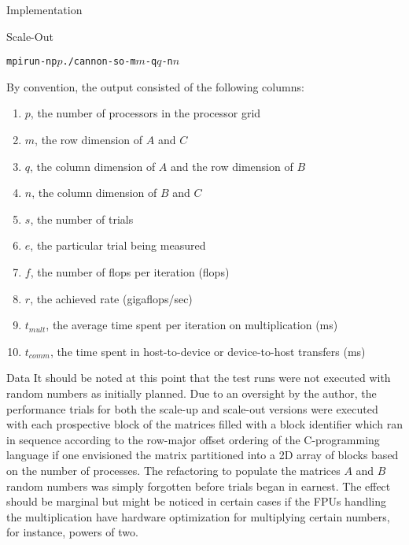 \documentclass{article}
\begin{document}
\begin{section}{Implementation}
\begin{subsection}{Scale-Out}
\begin{paragraph}{}
      \begin{subparagraph}{}
        \begin{alltt}
          mpirun -np \(p\) ./cannon-so -m \(m\) -q \(q\) -n \(n\)
        \end{alltt}
      \end{subparagraph}
    \end{paragraph}
    \begin{paragraph}{}
      By convention, the output consisted of the following columns:
      \begin{enumerate}
      \item{$p$, the number of processors in the processor grid}
      \item{$m$, the row dimension of $A$ and $C$}
      \item{$q$, the column dimension of $A$ and the row dimension of $B$}
      \item{$n$, the column dimension of $B$ and $C$}
      \item{$s$, the number of trials}
      \item{$e$, the particular trial being measured}
      \item{$f$, the number of flops per iteration (flops)}
      \item{$r$, the achieved rate (gigaflops/sec)}
      \item{$t_{mult}$, the average time spent per iteration on multiplication (ms)}
      \item{$t_{comm}$, the time spent in host-to-device or device-to-host transfers (ms)}
      \end{enumerate}
    \end{paragraph}
  \end{subsection}
  \begin{subsection}{Data}
    It should be noted at this point that the test runs were not executed with random numbers as initially planned. Due to an oversight by the author,
    the performance trials for both the scale-up and scale-out versions were executed with each prospective block of the matrices filled with a block
    identifier which ran in sequence according to the row-major offset ordering of the C-programming language if one envisioned the matrix partitioned
    into a 2D array of blocks based on the number of processes. The refactoring to populate the matrices $A$ and $B$ random numbers was simply forgotten
    before trials began in earnest. The effect should be marginal but might be noticed in certain cases if the FPUs handling the multiplication
    have hardware optimization for multiplying certain numbers, for instance, powers of two.
  \end{subsection}
\end{section}
\end{document}
